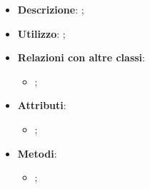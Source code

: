 			\begin{itemize}
				\item \textbf{Descrizione}: ;
				\item \textbf{Utilizzo}: ;
				\item \textbf{Relazioni con altre classi}: 
				\begin{itemize}
					\item ;
				\end{itemize}
				\item \textbf{Attributi}: 
				\begin{itemize}
					\item ;
				\end{itemize}
				\item \textbf{Metodi}: 
				\begin{itemize}
					\item ;
				\end{itemize}
			\end{itemize}
																					